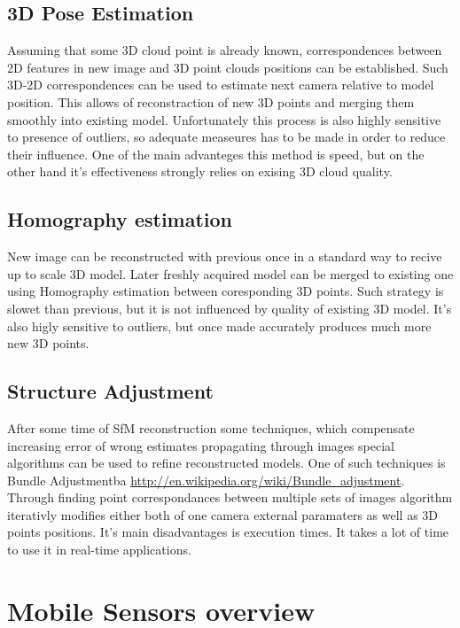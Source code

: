 \subsection{3D Pose Estimation}
Assuming that some 3D cloud point is already known, correspondences between 2D features in new image and 3D point clouds positions can be established. Such 3D-2D correspondences can be used to estimate next camera relative to model position. This allows of reconstraction of new 3D points and merging them smoothly into existing model. Unfortunately this process is also highly sensitive to presence of outliers, so adequate measeures has to be made in order to reduce their influence. One of the main advanteges this method is speed, but on the other hand it's effectiveness strongly relies on exising 3D cloud quality. 
\subsection{Homography estimation}
New image can be reconstructed with previous once in a standard way to recive up to scale 3D model. Later freshly acquired model can be merged to existing one using Homography estimation between coresponding 3D points. Such strategy is slowet than previous, but it is not influenced by quality of existing 3D model. It's also higly sensitive to outliers, but once made accurately produces much more new 3D points.
\subsection{Structure Adjustment}
After some time of SfM reconstruction some techniques, which compensate increasing error of wrong estimates propagating through images special algorithms can be used to refine reconstructed models. One of such techniques is Bundle Adjustment\gls{ba} \url{http://en.wikipedia.org/wiki/Bundle_adjustment}. Through finding point correspondances between multiple sets of images algorithm iterativly modifies either both of one camera external paramaters as well as 3D points positions. It's main disadvantages is execution times. It takes a lot of time to use it in real-time applications.
\section{Mobile Sensors overview}
